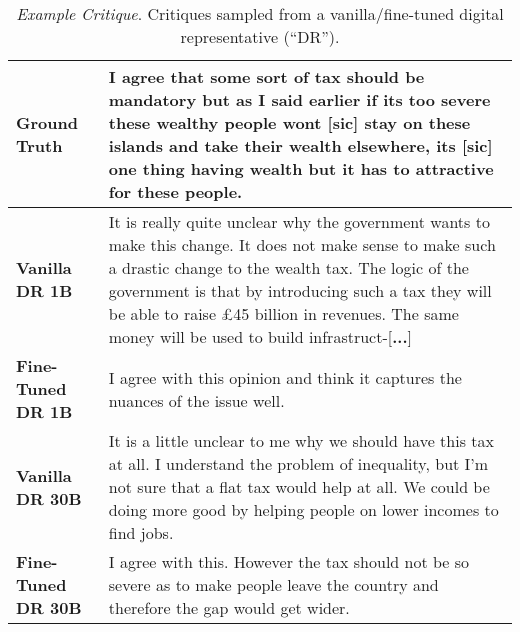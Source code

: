 \begin{table}[htbp]\small
\caption{\textit{Example Critique}. Critiques sampled from a vanilla/fine-tuned digital representative (``DR'').}
\label{tab:example}
\begin{center}
\begin{adjustbox}{max width=1.005\textwidth}
\begin{tabular}{A|B}
\toprule
\textbf{Ground Truth}
&
I agree that some sort of tax should be mandatory but as I said earlier if its too severe these wealthy people wont [\textbf{sic}] stay on these islands and take their wealth elsewhere, its [\textbf{sic}] one thing having wealth but it has to attractive for these people.
\\
\midrule
\textbf{Vanilla DR 1B}
&
It is really quite unclear why the government wants to make this change. It does not make sense to make such a drastic change to the wealth tax. The logic of the government is that by introducing such a tax they will be able to raise £45 billion in revenues. The same money will be used to build infrastruct-[\textbf{...}]
\\
\midrule
\textbf{Fine-Tuned DR 1B}
&
I agree with this opinion and think it captures the nuances of the issue well.
\\
\midrule
\textbf{Vanilla DR 30B}
&
It is a little unclear to me why we should have this tax at all. I understand the problem of inequality, but I'm not sure that a flat tax would help at all. We could be doing more good by helping people on lower incomes to find jobs.
\\
\midrule
\textbf{Fine-Tuned DR 30B}
&
I agree with this. However the tax should not be so severe as to make people leave the country and therefore the gap would get wider.
\\
\bottomrule
\end{tabular}
\end{adjustbox}
\end{center}
\vspace{-1em}
\end{table}

